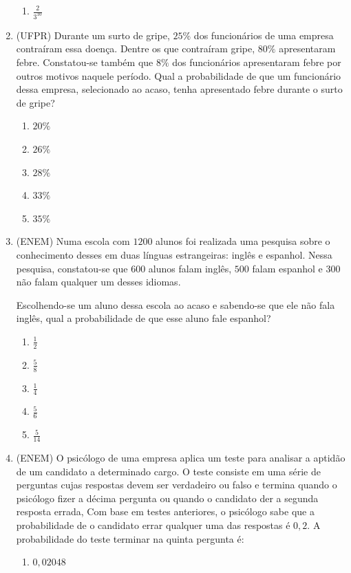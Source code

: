 \begin{enumerate}
\begin{enumerate}
\item {} 
\(\displaystyle\frac{2}{3^{10}}\)

\end{enumerate}

\item (UFPR) Durante um surto de gripe, $25\%$ dos funcionários de uma empresa contraíram essa doença. Dentre os que contraíram gripe, $80\%$ apresentaram febre. Constatou-se também que $8\%$ dos funcionários apresentaram febre por outros motivos naquele período. Qual a probabilidade de que um funcionário dessa empresa, selecionado ao acaso, tenha apresentado febre durante o surto de gripe?
\begin{enumerate}
\item {} 
$20\%$

\item {} 
$26\%$

\item {} 
$28\%$

\item {} 
$33\%$

\item {} 
$35\%$

\end{enumerate}

\item (ENEM) Numa escola com $1200$ alunos foi realizada uma pesquisa sobre o conhecimento desses em duas línguas estrangeiras: inglês e espanhol. Nessa pesquisa, constatou-se que $600$ alunos falam inglês, $500$ falam espanhol e $300$ não falam qualquer um desses idiomas.

Escolhendo-se um aluno dessa escola ao acaso e sabendo-se que ele não fala inglês, qual a probabilidade de que esse aluno fale espanhol?
\begin{enumerate}
\item {} 
\(\frac{1}{2}\)

\item {} 
\(\frac{5}{8}\)

\item {} 
\(\frac{1}{4}\)

\item {} 
\(\frac{ 5}{6}\)

\item {} 
\(\frac{5}{14}\)

\end{enumerate}

\item (ENEM) O psicólogo de uma empresa aplica um teste para analisar a aptidão de um candidato a determinado cargo. O teste consiste em uma série de perguntas cujas respostas devem ser verdadeiro ou falso e termina quando o psicólogo fizer a décima pergunta ou quando o candidato der a segunda resposta errada, Com base em testes anteriores, o psicólogo sabe que a probabilidade de o candidato errar qualquer uma das respostas é $0{,}2$. A probabilidade do teste terminar na quinta pergunta é:
\begin{enumerate}
\item {} 
$0{,}02048$


\end{enumerate}
\end{enumerate}
